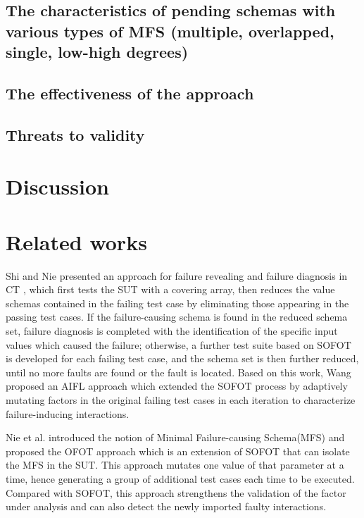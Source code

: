 {\subsection{The characteristics of pending schemas with various types of MFS (multiple, overlapped, single, low-high degrees)}



\subsection{The effectiveness of the approach}



\subsection{Threats to validity}


\section{Discussion}\label{sec:discussion}


\section{Related works}\label{sec:related}
Shi and Nie \cite{shi2005software} presented an approach for failure revealing and failure diagnosis in CT , which first tests the SUT with a covering array, then reduces the value schemas contained in the failing test case by eliminating those appearing in the passing test cases. If the failure-causing schema is found in the reduced schema set, failure diagnosis is completed with the identification of the specific input values which caused the failure; otherwise, a further test suite based on SOFOT is developed for each failing test case, and the schema set is then further reduced, until no more faults are found or the fault is located. Based on this work, Wang \cite{wang2010adaptive} proposed an AIFL approach which extended the SOFOT process by adaptively mutating factors in the original failing test cases in each iteration to characterize failure-inducing interactions.

Nie et al. \cite{nie2011minimal} introduced the notion of Minimal Failure-causing Schema(MFS) and proposed the OFOT approach which is an extension of SOFOT that can isolate the MFS in the SUT. This approach mutates one value of that parameter at a time, hence generating a group of additional test cases each time to be executed. Compared with SOFOT, this approach  strengthens the validation of the factor under analysis and can also detect the newly imported faulty interactions.

}
